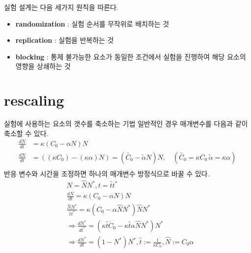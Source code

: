 \documentclass{article}
\begin{document}
    실험 설계는 다음 세가지 원칙을 따른다.
    \begin{itemize}
        \item \textbf{randomization} : 실험 순서를 무작위로 배치하는 것
        \item \textbf{replication} : 실험을 반복하는 것
        \item \textbf{blocking} : 통제 불가능한 요소가 동일한 조건에서 실험을 진행하여 해당 요소의 영향을 상쇄하는 것
    \end{itemize}

    \section{rescaling}
    실험에 사용하는 요소의 갯수를 축소하는 기법
    일반적인 경우 매개변수를 다음과 같이 축소할 수 있다.
    \begin{align*}
        \frac{dN}{dt} &= \kappa(C_0 -\alpha N)N \\
        \frac{dN}{dt} &= ((\kappa C_0)-(\kappa \alpha)N) = (\widetilde{C_0}-\widetilde{\alpha}N)N, \quad (\widetilde{C_0} = \kappa C_0 \, \widetilde{\alpha} = \kappa\alpha)\\
    \end{align*}
    반응 변수와 시간을 조정하면 하나의 매개변수 방정식으로 바꿀 수 있다.
    \begin{align*}
        &N = \hat{N}N^*, t = \hat{t}t^*\\
        &\frac{dN}{dt} = \kappa(C_0 -\alpha N)N \\
        &\frac{\hat{N}N^*}{\hat{t}t^*} = \kappa(C_0 -\alpha \hat{N}N^*)\hat{N}N^*\\
        &\Rightarrow \frac{dN^*}{dt^*} = (\kappa\hat{t}C_0-\kappa\hat{t}\alpha\hat{N}N^*)N^*\\
        &\Rightarrow \frac{dN^*}{dt} = (1-N^*)N^* , \hat{t} := \frac{1}{\kappa C_0}, \hat{N} := C_0\alpha\\
    \end{align*}
\end{document}
